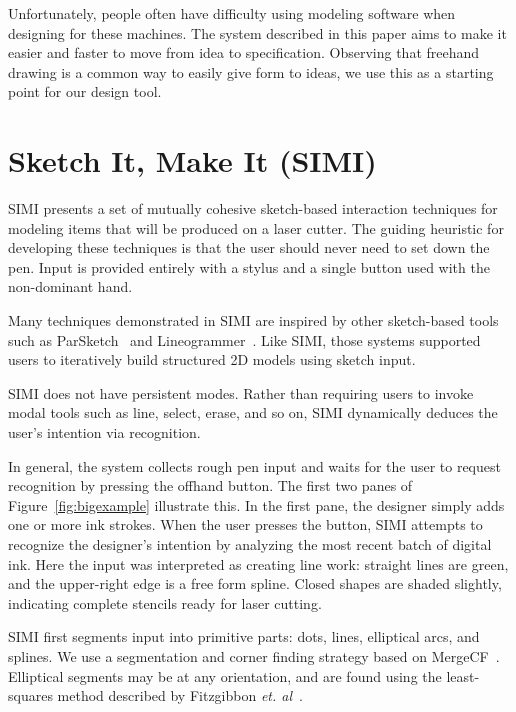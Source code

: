 \documentclass{chi-ext}
\begin{document}
Unfortunately, people often have difficulty using modeling software
when designing for these machines. The system described in this paper
aims to make it easier and faster to move from idea to
specification. Observing that freehand drawing is a common way to
easily give form to ideas, we use this as a starting point for our
design tool.


\section{Sketch It, Make It (SIMI)}

SIMI presents a set of mutually cohesive sketch-based interaction
techniques for modeling items that will be produced on a laser
cutter. The guiding heuristic for developing these techniques is that
the user should never need to set down the pen. Input is provided
entirely with a stylus and a single button used with the non-dominant
hand.

Many techniques demonstrated in SIMI are inspired by other
sketch-based tools such as ParSketch~\cite{naya-parsketch} and
Lineogrammer~\cite{zeleznik-lineogrammer}. Like SIMI, those systems
supported users to iteratively build structured 2D models using sketch
input.

SIMI does not have persistent modes. Rather than requiring users to
invoke modal tools such as line, select, erase, and so on, SIMI
dynamically deduces the user's intention via recognition.

In general, the system collects rough pen input and waits for the user
to request recognition by pressing the offhand button. The first two
panes of Figure~\ref{fig:bigexample} illustrate this. In the first
pane, the designer simply adds one or more ink strokes. When the user
presses the button, SIMI attempts to recognize the designer's
intention by analyzing the most recent batch of digital ink. Here the
input was interpreted as creating line work: straight lines are green,
and the upper-right edge is a free form spline. Closed shapes are
shaded slightly, indicating complete stencils ready for laser cutting.

SIMI first segments input into primitive parts: dots, lines,
elliptical arcs, and splines. We use a segmentation and corner finding
strategy based on MergeCF~\cite{wolin-smr}. Elliptical segments may be
at any orientation, and are found using the least-squares method
described by Fitzgibbon
\textit{et. al}~\cite{fitzgibbon-ellipse-fitting}.
\end{document}
